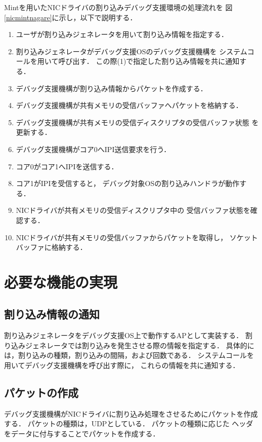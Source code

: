 \documentclass[tanilab-enum]{graduate}
\begin{document}
Mintを用いたNICドライバの割り込みデバッグ支援環境の処理流れを
図\ref{nicmintnagare}に示し，以下で説明する．
\begin{enumerate}
    \item
        ユーザが割り込みジェネレータを用いて割り込み情報を指定する．
    \item 
        割り込みジェネレータがデバッグ支援OSのデバッグ支援機構を
        システムコールを用いて呼び出す．
        この際(1)で指定した割り込み情報を共に通知する．
    \item 
        デバッグ支援機構が割り込み情報からパケットを作成する．
    \item 
        デバッグ支援機構が共有メモリの受信バッファへパケットを格納する．
    \item 
        デバッグ支援機構が共有メモリの受信ディスクリプタの受信バッファ状態
        を更新する．
    \item
        デバッグ支援機構がコア0へIPI送信要求を行う．
    \item
        コア0がコア1へIPIを送信する．
    \item 
        コア1がIPIを受信すると，
        デバッグ対象OSの割り込みハンドラが動作する．
    \item 
        NICドライバが共有メモリの受信ディスクリプタ中の
        受信バッファ状態を確認する．
    \item 
        NICドライバが共有メモリの受信バッファからパケットを取得し，
        ソケットバッファに格納する．
\end{enumerate}

\section{必要な機能の実現}

\subsection*{割り込み情報の通知}
割り込みジェネレータをデバッグ支援OS上で動作するAPとして実装する．
割り込みジェネレータでは割り込みを発生させる際の情報を指定する．
具体的には，割り込みの種類，割り込みの間隔，および回数である．
システムコールを用いてデバッグ支援機構を呼び出す際に，
これらの情報を共に通知する．

\subsection*{パケットの作成}\label{packet}
デバッグ支援機構がNICドライバに割り込み処理をさせるためにパケットを作成する．
パケットの種類は，UDPとしている．
パケットの種類に応じた
ヘッダをデータに付与することでパケットを作成する．
\end{document}
